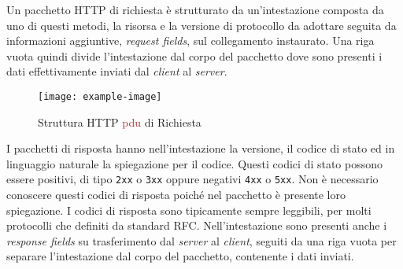 \documentclass{article}
\numberwithin{equation}{subsection}
\begin{document}
Un pacchetto \textcolor{NavyBlue}{HTTP} di richiesta è strutturato da un'intestazione composta da uno di questi metodi, la risorsa e la versione di protocollo da adottare 
seguita da informazioni aggiuntive, \textit{request fields}, sul collegamento instaurato. Una riga vuota quindi divide l'intestazione dal corpo del pacchetto dove sono presenti i dati effettivamente inviati dal \textit{client} al \textit{server}. 

\begin{figure}[H]%
    \centering%
    \texttt{[image: example-image]}%
    \caption{Struttura \textcolor{NavyBlue}{HTTP} \textcolor{Brown}{pdu} di Richiesta}%
\end{figure}

I pacchetti di risposta hanno nell'intestazione la versione, il codice di stato ed in linguaggio naturale la spiegazione per 
il codice. 
Questi codici di stato possono essere positivi, di tipo \verb|2xx| o \verb|3xx| oppure negativi \verb|4xx| o \verb|5xx|. Non è necessario conoscere questi codici di 
risposta poiché nel pacchetto è presente loro spiegazione. 
I codici di risposta sono tipicamente sempre leggibili, per molti protocolli che definiti da standard RFC. 
Nell'intestazione sono presenti anche i \textit{response fields} su trasferimento dal \textit{server} al \textit{client}, seguiti da una riga vuota per separare l'intestazione dal corpo del pacchetto, contenente i dati inviati. 
\end{document}

